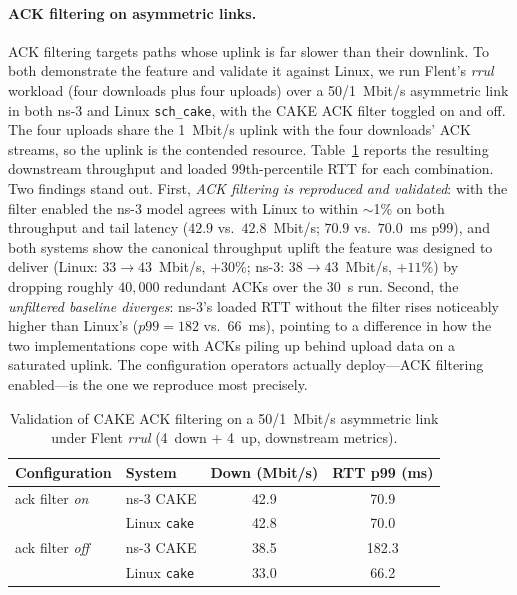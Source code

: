 \documentclass[sigconf,nonacm]{acmart}
\begin{document}
\paragraph{ACK filtering on asymmetric links.} ACK filtering targets paths whose
uplink is far slower than their downlink. To both demonstrate the feature and
validate it against Linux, we run Flent's \emph{rrul} workload (four downloads
plus four uploads) over a 50/1~Mbit/s asymmetric link in both ns-3 and Linux
\texttt{sch\_cake}, with the CAKE ACK filter toggled on and off. The four
uploads share the 1~Mbit/s uplink with the four downloads' ACK streams, so the
uplink is the contended resource. Table~\ref{tab:ack} reports the resulting
downstream throughput and loaded 99th-percentile RTT for each combination. Two
findings stand out. First, \emph{ACK filtering is reproduced and validated}:
with the filter enabled the ns-3 model agrees with Linux to within $\sim$1\% on
both throughput and tail latency ($42.9$ vs.\ $42.8$~Mbit/s; $70.9$ vs.\
$70.0$~ms p99), and both systems show the canonical throughput uplift the
feature was designed to deliver (Linux: $33{\to}43$~Mbit/s, $+30\%$; ns-3:
$38{\to}43$~Mbit/s, $+11\%$) by dropping roughly $40{,}000$ redundant ACKs over
the 30~s run. Second, the \emph{unfiltered baseline diverges}: ns-3's loaded
RTT without the filter rises noticeably higher than Linux's ($p99{=}182$ vs.\
$66$~ms), pointing to a difference in how the two implementations cope with
ACKs piling up behind upload data on a saturated uplink. The configuration
operators actually deploy---ACK filtering enabled---is the one we reproduce
most precisely.

\begin{table}[t]
\caption{Validation of CAKE ACK filtering on a 50/1~Mbit/s asymmetric link
under Flent \emph{rrul} (4~down + 4~up, downstream metrics).}
\label{tab:ack}
\small
\begin{tabular}{@{}llcc@{}}
\toprule
Configuration & System & Down (Mbit/s) & RTT p99 (ms)\\
\midrule
ack filter \emph{on}  & ns-3 CAKE          & 42.9 & 70.9\\
                      & Linux \texttt{cake} & 42.8 & 70.0\\
ack filter \emph{off} & ns-3 CAKE          & 38.5 & 182.3\\
                      & Linux \texttt{cake} & 33.0 & 66.2\\
\bottomrule
\end{tabular}
\end{table}
\end{document}
